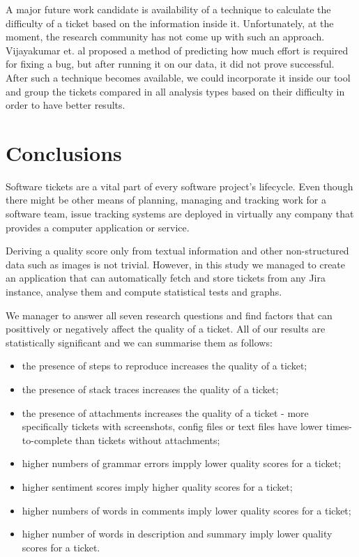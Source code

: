 \documentclass{mpaper}
\begin{document}
A major future work candidate is availability of a technique to calculate the difficulty of a ticket based on the information
inside it. Unfortunately, at the moment, the research community has not come up with such an approach. 
Vijayakumar et. al \cite{vijayakumar2014much} proposed a method of predicting how much effort is required for fixing 
a bug, but after running it on our data, it did not prove successful. After such a technique becomes available, we could 
incorporate it inside our tool and group the tickets compared in all analysis types based on their difficulty in order to 
have better results.

\section{Conclusions}\label{conclusions}

Software tickets are a vital part of every software project's lifecycle. Even though there might be other means
of planning, managing and tracking work for a software team, issue tracking systems are deployed in virtually any company
that provides a computer application or service.

Deriving a quality score only from textual information and other non-structured data such as images is not trivial. 
However, in this study we managed to create an application that can automatically fetch and store tickets from any 
Jira instance, analyse them and compute statistical tests and graphs.

We manager to answer all seven research questions and find factors that can posittively or 
negatively affect the quality of a ticket. All of our results are statistically significant and we can summarise 
them as follows:
\begin{itemize}
  \item the presence of steps to reproduce increases the quality of a ticket;
  \item the presence of stack traces increases the quality of a ticket;
  \item the presence of attachments increases the quality of a ticket - more specifically tickets with screenshots, 
  config files or text files have lower times-to-complete than tickets without attachments;
  \item higher numbers of grammar errors impply lower quality scores for a ticket;
  \item higher sentiment scores imply higher quality scores for a ticket;
  \item higher numbers of words in comments imply lower quality scores for a ticket;
  \item higher number of words in description and summary imply lower quality scores for a ticket.
\end{itemize}
\end{document}
